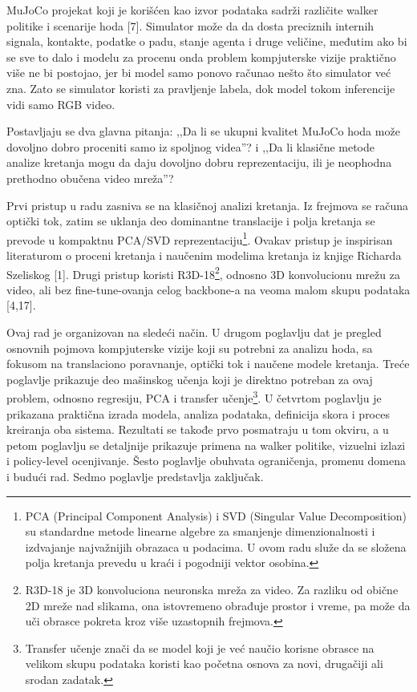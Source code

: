﻿\documentclass[12pt,a4paper]{report}
\begin{document}
MuJoCo projekat koji je korišćen kao izvor podataka sadrži različite walker
politike i scenarije hoda [7]. Simulator može da da dosta preciznih internih
signala, kontakte, podatke o padu, stanje agenta i druge veličine, međutim ako bi
se sve to dalo i modelu za procenu onda problem kompjuterske vizije praktično više
ne bi postojao, jer bi model samo ponovo računao nešto što simulator već zna.
Zato se simulator koristi za pravljenje labela, dok model tokom inferencije vidi
samo RGB video.

Postavljaju se dva glavna pitanja: ,,Da li se ukupni kvalitet MuJoCo hoda može
dovoljno dobro proceniti samo iz spoljnog videa''? i ,,Da li klasične metode
analize kretanja mogu da daju dovoljno dobru reprezentaciju, ili je neophodna
prethodno obučena video mreža''?

Prvi pristup u radu zasniva se na klasičnoj analizi kretanja. Iz frejmova se
računa optički tok, zatim se uklanja deo dominantne translacije i polja kretanja
se prevode u kompaktnu PCA/SVD reprezentaciju\footnote{PCA (Principal Component Analysis)
i SVD (Singular Value Decomposition) su standardne metode linearne algebre za
smanjenje dimenzionalnosti i izdvajanje najvažnijih obrazaca u podacima. U ovom
radu služe da se složena polja kretanja prevedu u kraći i pogodniji vektor osobina.}.
Ovakav pristup je inspirisan literaturom o proceni kretanja i naučenim modelima
kretanja iz knjige Richarda Szeliskog [1]. Drugi pristup koristi R3D-18\footnote{R3D-18
je 3D konvoluciona neuronska mreža za video. Za razliku od obične 2D mreže nad
slikama, ona istovremeno obrađuje prostor i vreme, pa može da uči obrasce pokreta
kroz više uzastopnih frejmova.}, odnosno 3D konvolucionu
mrežu za video, ali bez fine-tune-ovanja celog backbone-a na veoma malom skupu
podataka [4,17].

Ovaj rad je organizovan na sledeći način. U drugom poglavlju dat je pregled
osnovnih pojmova kompjuterske vizije koji su potrebni za analizu hoda, sa fokusom
na translaciono poravnanje, optički tok i naučene modele kretanja. Treće
poglavlje prikazuje deo mašinskog učenja koji je direktno potreban za ovaj
problem, odnosno regresiju, PCA i transfer učenje\footnote{Transfer učenje znači da
se model koji je već naučio korisne obrasce na velikom skupu podataka koristi kao
početna osnova za novi, drugačiji ali srodan zadatak.}. U četvrtom poglavlju je
prikazana praktična izrada modela, analiza podataka, definicija skora i proces
kreiranja oba sistema. Rezultati se takođe prvo posmatraju u tom okviru, a u
petom poglavlju se detaljnije prikazuje primena na walker politike, vizuelni
izlazi i policy-level ocenjivanje. Šesto poglavlje obuhvata ograničenja,
promenu domena i budući rad. Sedmo poglavlje predstavlja zaključak.
\end{document}
